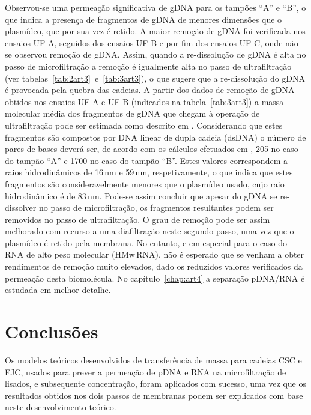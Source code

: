 Observou-se uma permeação significativa de gDNA para os tampões ``A'' e ``B'', o que indica a presença de fragmentos de gDNA de menores dimensões que o plasmídeo, que por sua vez é retido.
%
%
A maior remoção de gDNA foi verificada nos ensaios UF-A, seguidos dos ensaios UF-B e por fim dos ensaios UF-C, onde não se observou remoção de gDNA. Assim, quando a re-dissolução de gDNA é alta no passo de microfiltração a remoção é igualmente alta no passo de ultrafiltração (ver tabelas~\ref{tab:2art3}~e~\ref{tab:3art3}), o que sugere que a re-dissolução do gDNA é provocada pela quebra das cadeias.
%
A partir dos dados de remoção de gDNA obtidos nos ensaios UF-A e UF-B (indicados na tabela~\ref{tab:3art3}) a massa molecular média dos fragmentos de gDNA que chegam à operação de ultrafiltração pode ser estimada como descrito em \cite{meu3}.
%
Considerando que estes fragmentos são compostos por DNA linear de dupla cadeia (dsDNA) o número de pares de bases deverá ser, de acordo com os cálculos efetuados em \cite{meu3}, 205 no caso do tampão ``A'' e 1700 no caso do tampão ``B''. Estes valores correspondem a raios hidrodinâmicos de 16\,nm e 59\,nm, respetivamente, o que indica que estes fragmentos são consideravelmente menores que o plasmídeo usado, cujo raio hidrodinâmico é de 83\,nm. Pode-se assim concluir que apesar do gDNA se re-dissolver no passo de microfiltração, os fragmentos resultantes podem ser removidos no passo de ultrafiltração. O grau de remoção pode ser assim melhorado com recurso a uma diafiltração neste segundo passo, uma vez que o plasmídeo é retido pela membrana. No entanto, e em especial para o caso do RNA de alto peso molecular (HMw\,RNA), não é esperado que se venham a obter rendimentos de remoção muito elevados, dado os reduzidos valores verificados da permeação desta biomolécula. No capítulo~\ref{chap:art4} a separação pDNA/RNA é estudada em melhor detalhe.

\section{Conclusões}
Os modelos teóricos desenvolvidos de transferência de massa para cadeias CSC e FJC, usados para prever a permeação de pDNA e RNA na microfiltração de lisados, e subsequente concentração, foram aplicados com sucesso, uma vez que os resultados obtidos nos dois passos de membranas podem ser explicados com base neste desenvolvimento teórico.

